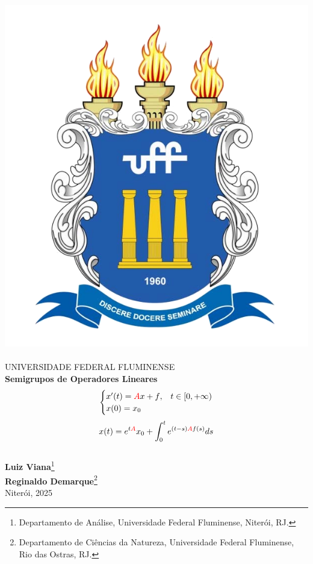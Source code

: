 \documentclass[12pt]{book}
\theoremstyle{definition}
\theoremstyle{remark}
\numberwithin{section}{chapter}
\numberwithin{equation}{chapter}
\begin{document}
\begin{titlepage}
\begin{center}
\includegraphics[scale=0.15]{brasao-cor.png}~\\
UNIVERSIDADE FEDERAL FLUMINENSE \\[5cm]
{\Huge \textbf{Semigrupos de Operadores Lineares}}\\
{\Large
\begin{equation*}
\begin{cases}
x'(t)={\color{red}A}x+{\color{black}f},& t\in [0,+\infty)\\
x(0)=x_0
\end{cases}
\end{equation*}
\begin{equation*}
x(t)=e^{t\color{red}A}x_0+\int_0^t e^{(t-s){\color{red}A}f(s)}ds
\end{equation*}}\\[2cm]
\textbf{Luiz Viana}\footnote{Departamento de Análise, Universidade Federal Fluminense, Niterói, RJ.}\\
\textbf{Reginaldo Demarque}\footnote{Departamento de Ciências da Natureza, Universidade Federal Fluminense, Rio das Ostras, RJ.}\\
\vfill
{\large Niterói, 2025}
\end{center}
\end{titlepage}
\end{document}
